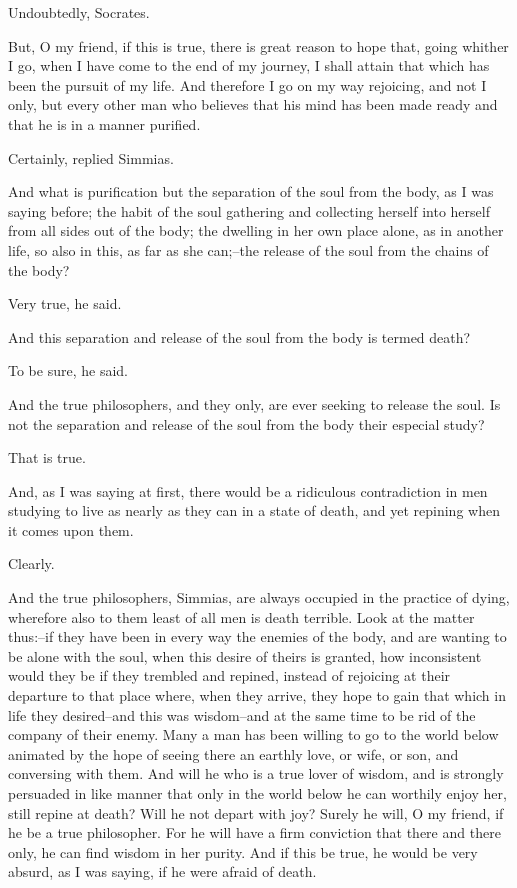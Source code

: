 Undoubtedly, Socrates.

But, O my friend, if this is true, there is great reason to hope that,
going whither I go, when I have come to the end of my journey, I shall
attain that which has been the pursuit of my life. And therefore I go on
my way rejoicing, and not I only, but every other man who believes that
his mind has been made ready and that he is in a manner purified.

Certainly, replied Simmias.

And what is purification but the separation of the soul from the body,
as I was saying before; the habit of the soul gathering and collecting
herself into herself from all sides out of the body; the dwelling in
her own place alone, as in another life, so also in this, as far as she
can;--the release of the soul from the chains of the body?

Very true, he said.

And this separation and release of the soul from the body is termed
death?

To be sure, he said.

And the true philosophers, and they only, are ever seeking to release
the soul. Is not the separation and release of the soul from the body
their especial study?

That is true.

And, as I was saying at first, there would be a ridiculous contradiction
in men studying to live as nearly as they can in a state of death, and
yet repining when it comes upon them.

Clearly.

And the true philosophers, Simmias, are always occupied in the practice
of dying, wherefore also to them least of all men is death terrible.
Look at the matter thus:--if they have been in every way the enemies of
the body, and are wanting to be alone with the soul, when this desire of
theirs is granted, how inconsistent would they be if they trembled and
repined, instead of rejoicing at their departure to that place where,
when they arrive, they hope to gain that which in life they desired--and
this was wisdom--and at the same time to be rid of the company of their
enemy. Many a man has been willing to go to the world below animated
by the hope of seeing there an earthly love, or wife, or son, and
conversing with them. And will he who is a true lover of wisdom, and is
strongly persuaded in like manner that only in the world below he can
worthily enjoy her, still repine at death? Will he not depart with joy?
Surely he will, O my friend, if he be a true philosopher. For he will
have a firm conviction that there and there only, he can find wisdom
in her purity. And if this be true, he would be very absurd, as I was
saying, if he were afraid of death.

